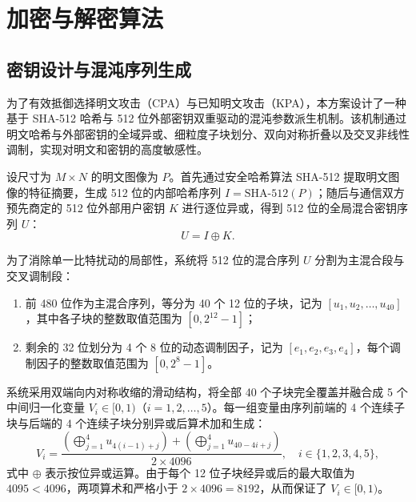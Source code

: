 \section{加密与解密算法}

\subsection{密钥设计与混沌序列生成}

为了有效抵御选择明文攻击（CPA）与已知明文攻击（KPA），本方案设计了一种基于 SHA-512 哈希与 512 位外部密钥双重驱动的混沌参数派生机制。该机制通过明文哈希与外部密钥的全域异或、细粒度子块划分、双向对称折叠以及交叉非线性调制，实现对明文和密钥的高度敏感性。

设尺寸为 $M \times N$ 的明文图像为 $P$。首先通过安全哈希算法 SHA-512 提取明文图像的特征摘要，生成 512 位的内部哈希序列 $I = \text{SHA-512}(P)$；随后与通信双方预先商定的 512 位外部用户密钥 $K$ 进行逐位异或，得到 512 位的全局混合密钥序列 $U$：
\begin{equation}
    U = I \oplus K.
\end{equation}

为了消除单一比特扰动的局部性，系统将 512 位的混合序列 $U$ 分割为主混合段与交叉调制段：
\begin{enumerate}
    \item 前 480 位作为主混合序列，等分为 40 个 12 位的子块，记为 $[u_1, u_2, \dots, u_{40}]$，其中各子块的整数取值范围为 $[0, 2^{12}-1]$；
    \item 剩余的 32 位划分为 4 个 8 位的动态调制因子，记为 $[e_1, e_2, e_3, e_4]$，每个调制因子的整数取值范围为 $[0, 2^8-1]$。
\end{enumerate}

系统采用双端向内对称收缩的滑动结构，将全部 40 个子块完全覆盖并融合成 5 个中间归一化变量 $V_i \in [0, 1)$（$i = 1, 2, \dots, 5$）。每一组变量由序列前端的 4 个连续子块与后端的 4 个连续子块分别异或后算术加和生成：
\begin{equation}
    V_i = \frac{\left( \bigoplus_{j=1}^4 u_{4(i-1)+j} \right) + \left( \bigoplus_{j=1}^4 u_{40 - 4i + j} \right)}{2 \times 4096}, \quad i \in \{1, 2, 3, 4, 5\},
    \label{eq:Vi_v3}
\end{equation}
式中 $\oplus$ 表示按位异或运算。由于每个 12 位子块经异或后的最大取值为 $4095 < 4096$，两项算术和严格小于 $2 \times 4096 = 8192$，从而保证了 $V_i \in [0, 1)$。

